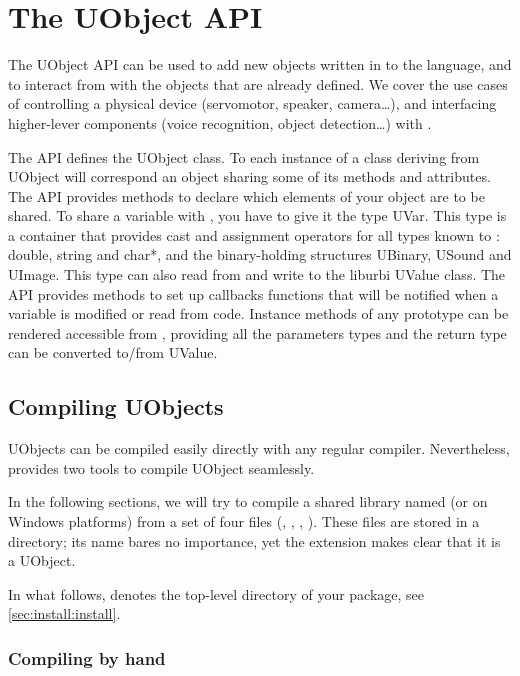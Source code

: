\chapter{The UObject API}
\label{sec:uob:api}

The UObject API can be used to add new objects written in \Cxx to the
\us language, and to interact from \Cxx with the objects that are
already defined. We cover the use cases of controlling a physical
device (servomotor, speaker, camera\ldots), and interfacing
higher-lever components (voice recognition, object detection\ldots)
with \urbi.

The \Cxx API defines the UObject class. To each instance of a \Cxx class
deriving from UObject
will correspond an \us object sharing some of its
methods and attributes. The API provides methods to declare which
elements of your object are to be shared. To share a variable with
\urbi, you have to give it the type UVar. This type is a container
that provides cast and assignment operators for all types known to
\urbi: double, string and char*, and the binary-holding structures
UBinary, USound and UImage. This type can also read from and write to
the liburbi UValue class. The API provides methods to set up callbacks
functions that will be notified when a variable is modified or read
from \urbi code. Instance methods of any prototype can be rendered
accessible from \us, providing all the parameters types and the return
type can be converted to/from UValue.

\section{Compiling UObjects}

UObjects can be compiled easily directly with any regular compiler.
Nevertheless, \usdk provides two tools to compile UObject seamlessly.

In the following sections, we will try to compile a shared library named
 (or  on Windows platforms) from a set of
four files (, , ,
).  These files are stored in a 
directory; its name bares no importance, yet the  extension
makes clear that it is a UObject.

In what follows,  denotes the top-level directory of your
\usdk package, see \autoref{sec:install:install}.

\subsection{Compiling by hand}

